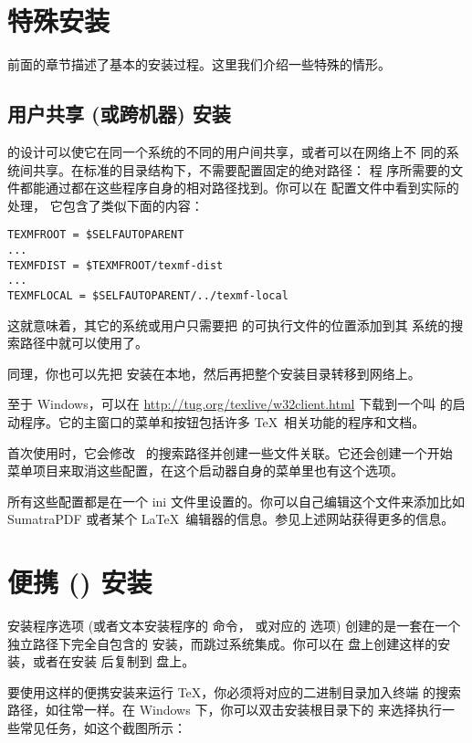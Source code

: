 \documentclass{article}
\begin{document}
\section{特殊安装}

前面的章节描述了基本的安装过程。这里我们介绍一些特殊的情形。

\subsection{用户共享 (或跨机器) 安装}
\label{sec:sharedinstall}

\TL{} 的设计可以使它在同一个系统的不同的用户间共享，或者可以在网络上不
同的系统间共享。在标准的目录结构下，不需要配置固定的绝对路径：\TL{} 程
序所需要的文件都能通过都在这些程序自身的相对路径找到。你可以在
 配置文件中看到实际的处理，
它包含了类似下面的内容：
\begin{verbatim}
TEXMFROOT = $SELFAUTOPARENT
...
TEXMFDIST = $TEXMFROOT/texmf-dist
...
TEXMFLOCAL = $SELFAUTOPARENT/../texmf-local
\end{verbatim}
这就意味着，其它的系统或用户只需要把 \TL{} 的可执行文件的位置添加到其
系统的搜索路径中就可以使用了。

同理，你也可以先把 \TL{} 安装在本地，然后再把整个安装目录转移到网络上。

至于 Windows，可以在 \url{http://tug.org/texlive/w32client.html}
下载到一个叫  的启动程序。它的主窗口的菜单和按钮包括许多
\TeX\ 相关功能的程序和文档。

首次使用时，它会修改 \TL\ 的搜索路径并创建一些文件关联。它还会创建一个开始
菜单项目来取消这些配置，在这个启动器自身的菜单里也有这个选项。

所有这些配置都是在一个 ini 文件里设置的。你可以自己编辑这个文件来添加比如
SumatraPDF 或者某个 \LaTeX\ 编辑器的信息。参见上述网站获得更多的信息。

\section{便携 (\USB{}) 安装}
\label{sec:portable-tl}

 安装程序选项 (或者文本安装程序的  命令，
或对应的 \GUI{} 选项) 创建的是一套在一个独立路径下完全自包含的 \TL{}
安装，而跳过系统集成。你可以在 \USB{} 盘上创建这样的安装，或者在安装
后复制到 \USB{} 盘上。

要使用这样的便携安装来运行 \TeX{}，你必须将对应的二进制目录加入终端
的搜索路径，如往常一样。在 Windows 下，你可以双击安装根目录下的
 来选择执行一些常见任务，如这个截图所示：
\end{document}

